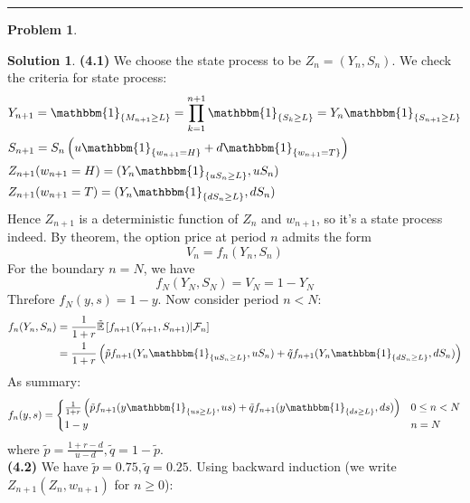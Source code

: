 \documentclass[a4paper, 10pt]{article}
\theoremstyle{definition}
\newtheorem{problem}{Problem}
\theoremstyle{hSol}
\newtheorem*{solution}{Solution}
\begin{document}
\noindent\rule{16cm}{0.4pt}
\begin{problem} 
\end{problem}
\begin{solution} \textbf{(4.1)} We choose the state process to be $Z_n = (Y_n, S_n)$. We check the criteria for state process:
\begin{equation}
  \begin{split}
    &Y_{n+1} = \mathbbm{1}_{\{M_{n+1}\geq L\}} = \prod_{k=1}^{n+1} \mathbbm{1}_{\{S_k \geq L\}} = Y_n \mathbbm{1}_{\{S_{n+1}\geq L\}} \\
    &S_{n+1} = S_n\left(u \mathbbm{1}_{\{w_{n+1}=H\}}+d \mathbbm{1}_{\{w_{n+1}=T\}}\right)\\
    &Z_{n+1}(w_{n+1} = H) = (Y_n \mathbbm{1}_{\{uS_n\geq L\}}, uS_n)\\
    &Z_{n+1}(w_{n+1} = T) = (Y_n \mathbbm{1}_{\{dS_n\geq L\}}, dS_n)\\
  \end{split}
\end{equation}
Hence $Z_{n+1}$ is a deterministic function of $Z_n$ and $w_{n+1}$, so it's a state process indeed. By theorem, the option price at period $n$ admits the form
$$
V_n = f_n(Y_n, S_n)
$$
For the boundary $n=N$, we have
$$
f_N(Y_N, S_N) = V_N = 1-Y_N
$$
Threfore $f_N(y,s) = 1-y$. Now consider period $n<N$:
\begin{equation}
  \begin{split}
    f_n(Y_n, S_n) &= \frac{1}{1+r}\tilde{\mathbb{E}}\left[f_{n+1}(Y_{n+1}, S_{n+1})\middle|\mathcal{F}_n\right] \\
    &= \frac{1}{1+r} \left(\tilde{p}f_{n+1}(Y_n \mathbbm{1}_{\{uS_n\geq L\}}, uS_n) + \tilde{q}f_{n+1}(Y_n \mathbbm{1}_{\{dS_n\geq L\}}, dS_n) \right)
  \end{split}
\end{equation}
As summary:
\begin{equation}
  f_n(y, s) = \begin{cases}
  \frac{1}{1+r} \left(\tilde{p}f_{n+1}(y \mathbbm{1}_{\{us\geq L\}}, us) + \tilde{q}f_{n+1}(y \mathbbm{1}_{\{ds\geq L\}}, ds) \right) & 0\leq n< N\\
  1-y & n=N
  \end{cases}
\end{equation}
where $\tilde{p}=\tfrac{1+r-d}{u-d}, \tilde{q}=1- \tilde{p}$.\\
\textbf{(4.2)} We have $\tilde{p} = 0.75,  \tilde{q} = 0.25$. Using backward induction (we write $Z_{n+1}(Z_n, w_{n+1})$ for $n\geq 0$):

\end{solution}
\end{document}

